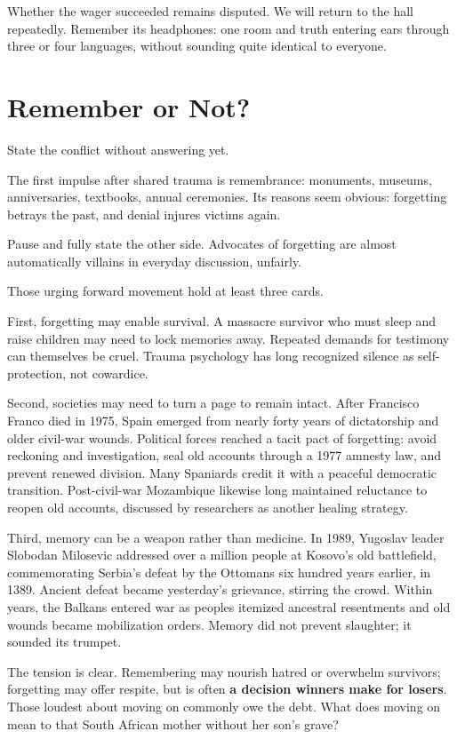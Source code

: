 Whether the wager succeeded remains disputed. We will return to the hall repeatedly. Remember its headphones: one room and truth entering ears through three or four languages, without sounding quite identical to everyone.

\section{Remember or Not?}
State the conflict without answering yet.

The first impulse after shared trauma is remembrance: monuments, museums, anniversaries, textbooks, annual ceremonies. Its reasons seem obvious: forgetting betrays the past, and denial injures victims again.

Pause and fully state the other side. Advocates of forgetting are almost automatically villains in everyday discussion, unfairly.

Those urging forward movement hold at least three cards.

First, forgetting may enable survival. A massacre survivor who must sleep and raise children may need to lock memories away. Repeated demands for testimony can themselves be cruel. Trauma psychology has long recognized silence as self-protection, not cowardice.

Second, societies may need to turn a page to remain intact. After Francisco Franco died in 1975, Spain emerged from nearly forty years of dictatorship and older civil-war wounds. Political forces reached a tacit pact of forgetting: avoid reckoning and investigation, seal old accounts through a 1977 amnesty law, and prevent renewed division. Many Spaniards credit it with a peaceful democratic transition. Post-civil-war Mozambique likewise long maintained reluctance to reopen old accounts, discussed by researchers as another healing strategy.

Third, memory can be a weapon rather than medicine. In 1989, Yugoslav leader Slobodan Milosevic addressed over a million people at Kosovo's old battlefield, commemorating Serbia's defeat by the Ottomans six hundred years earlier, in 1389. Ancient defeat became yesterday's grievance, stirring the crowd. Within years, the Balkans entered war as peoples itemized ancestral resentments and old wounds became mobilization orders. Memory did not prevent slaughter; it sounded its trumpet.

The tension is clear. Remembering may nourish hatred or overwhelm survivors; forgetting may offer respite, but is often \textbf{a decision winners make for losers}. Those loudest about moving on commonly owe the debt. What does moving on mean to that South African mother without her son's grave?

